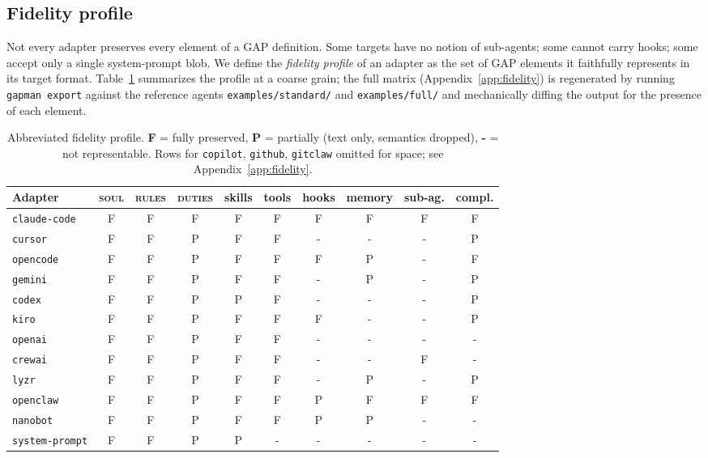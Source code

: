 \documentclass[11pt,a4paper]{article}
\begin{document}
\subsection{Fidelity profile}

Not every adapter preserves every element of a GAP definition. Some targets have no
notion of sub-agents; some cannot carry hooks; some accept only a single system-prompt
blob. We define the \emph{fidelity profile} of an adapter as the set of GAP
elements it faithfully represents in its target format. Table~\ref{tab:fidelity}
summarizes the profile at a coarse grain; the full matrix (Appendix~\ref{app:fidelity})
is regenerated by running \texttt{gapman export} against the reference agents
\texttt{examples/standard/} and \texttt{examples/full/} and mechanically diffing the
output for the presence of each element.

\begin{table}[h]
\centering
\footnotesize
\begin{tabular}{@{}lccccccccc@{}}
\toprule
Adapter & \textsc{soul} & \textsc{rules} & \textsc{duties} & skills & tools & hooks & memory & sub-ag. & compl. \\
\midrule
\texttt{claude-code}   & F & F & F & F & F & F & F & F & F \\
\texttt{cursor}        & F & F & P & F & F & - & - & - & P \\
\texttt{opencode}      & F & F & P & F & F & F & P & - & F \\
\texttt{gemini}        & F & F & P & F & F & - & P & - & P \\
\texttt{codex}         & F & F & P & P & F & - & - & - & P \\
\texttt{kiro}          & F & F & P & F & F & F & - & - & P \\
\texttt{openai}        & F & F & P & F & F & - & - & - & - \\
\texttt{crewai}        & F & F & P & F & F & - & - & F & - \\
\texttt{lyzr}          & F & F & P & F & F & - & P & - & P \\
\texttt{openclaw}      & F & F & P & F & F & P & F & F & F \\
\texttt{nanobot}       & F & F & P & F & F & P & P & - & - \\
\texttt{system-prompt} & F & F & P & P & - & - & - & - & - \\
\bottomrule
\end{tabular}
\caption{Abbreviated fidelity profile. \textbf{F} = fully preserved, \textbf{P} =
partially (text only, semantics dropped), \textbf{-} = not representable. Rows for
\texttt{copilot}, \texttt{github}, \texttt{gitclaw} omitted for space; see
Appendix~\ref{app:fidelity}.}
\label{tab:fidelity}
\end{table}
\end{document}
